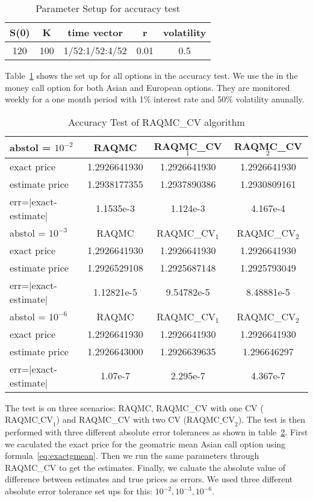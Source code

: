 \begin{table}[h]
    \centering
	\caption{Parameter Setup for accuracy test}
    \label{tb:accsetup}
	\begin{tabular}{ccccc}
		\hline\hline
        S(0) & K & time vector & r & volatility \\[0.5ex]
        \hline
        120  & 100 & 1/52:1/52:4/52 & 0.01 & 0.5 \\[1ex] 
        \hline
	\end{tabular}
\end{table}
Table~\ref{tb:accsetup} shows the set up for all options in the accuracy test.
We use the in the money call option for both Asian and European options. 
They are monitored weekly for a one month period with 1\% interest rate and 50\% volatility anunally. 
\begin{table}[h]
    \centering
	\caption{Accuracy Test of RAQMC\_CV algorithm}
    \label{tb:accuracy}
    \begin{tabular}{lccc}  
    \hline \hline
    abstol = $10^{-2}$ &RAQMC&RAQMC\_CV$_1$&RAQMC\_CV$_2$\\[0.5ex]
    \hline
    exact price& 1.2926641930& 1.2926641930&1.2926641930\\[0.5ex]
    estimate price& 1.2938177355& 1.2937890386&1.2930809161\\[0.5ex]
    err=$|$exact-estimate$|$ & 1.1535e-3& 1.124e-3&4.167e-4\\[0.5ex]
    \hline
    abstol = $10^{-3}$ &RAQMC&RAQMC\_CV$_1$&RAQMC\_CV$_2$\\[0.5ex]
    \hline
    exact price& 1.2926641930& 1.2926641930&1.2926641930\\[0.5ex]
    estimate price& 1.2926529108& 1.2925687148&1.2925793049\\[0.5ex]
    err=$|$exact-estimate$|$ & 1.12821e-5& 9.54782e-5&8.48881e-5\\[0.5ex]
    \hline
    abstol = $10^{-6}$ & RAQMC&RAQMC\_CV$_1$&RAQMC\_CV$_2$\\[0.5ex]
    \hline
    exact price& 1.2926641930& 1.2926641930&1.2926641930\\[0.5ex]
    estimate price& 1.2926643000& 1.2926639635&1.296646297\\[0.5ex]
    err=$|$exact-estimate$|$ & 1.07e-7& 2.295e-7&4.367e-7\\[0.5ex]
    \hline
    \end{tabular}
\end{table}
The test is on three scenarios: RAQMC, RAQMC\_CV with one CV ($\textrm{RAQMC\_CV}_1$) and RAQMC\_CV with two CV ($\textrm{RAQMC\_CV}_2$).
The test is then performed with three different absolute error tolerances as shown in table~\ref{tb:accuracy}.
First we caculated the exact price for the geomatric mean Asian call option using formula~\eqref{eq:exactgmean}. 
Then we run the same parameters through RAQMC\_CV to get the estimates. 
Finally, we caluate the absolute value of difference between estimates and true prices as errors. 
We used three different absolute error tolerance set ups for this: $10^{-2}, 10^{-3}, 10^{-6}$.   

